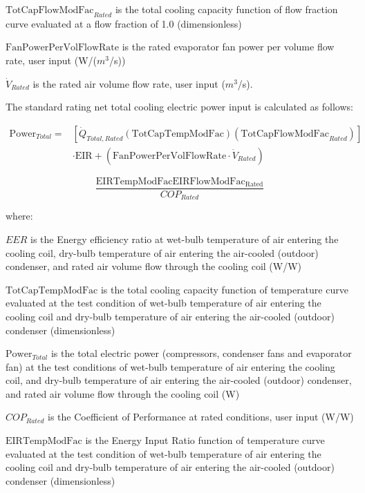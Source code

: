 \(\text{TotCapFlowModFac}_{Rated}\) is the total cooling capacity function of flow fraction curve evaluated at a flow fraction of 1.0 (dimensionless)

\(\text{FanPowerPerVolFlowRate}\) is the rated evaporator fan power per volume flow rate, user input (W/(\(m^3\)/s))

\(\dot{V}_{Rated}\) is the rated air volume flow rate, user input (\(m^3\)/s).

The standard rating net total cooling electric power input is calculated as follows:

\begin{equation}
\begin{array}{rl}
  \mathrm{Power}_{Total} =& \left[ \dot{Q}_{Total,Rated} \left( \mathrm{TotCapTempModFac} \right) \left( \mathrm{TotCapFlowModFac}_{Rated} \right) \right] \\
& \cdot \mathrm{EIR} + \left( \mathrm{FanPowerPerVolFlowRate} \cdot \dot{V}_{Rated} \right)
\end{array}
\end{equation}

\begin{equation}
  \frac{\mathrm{EIRTempModFac} \mathrm{EIRFlowModFac_{Rated}}}{COP_{Rated}}
\end{equation}

where:

\(EER\) is the Energy efficiency ratio at wet-bulb temperature of air entering the cooling coil, dry-bulb temperature of air entering the air-cooled (outdoor) condenser, and rated air volume flow through the cooling coil (W/W)

\(\mathrm{TotCapTempModFac}\) is the total cooling capacity function of temperature curve evaluated at the test condition of wet-bulb temperature of air entering the cooling coil and dry-bulb temperature of air entering the air-cooled (outdoor) condenser (dimensionless)

\(\mathrm{Power}_{Total}\) is the total electric power (compressors, condenser fans and evaporator fan) at the test conditions of wet-bulb temperature of air entering the cooling coil, and dry-bulb temperature of air entering the air-cooled (outdoor) condenser, and rated air volume flow through the cooling coil (W)

\(COP_{Rated}\) is the Coefficient of Performance at rated conditions, user input (W/W)

\(\mathrm{EIRTempModFac}\) is the Energy Input Ratio function of temperature curve evaluated at the test condition of wet-bulb temperature of air entering the cooling coil and dry-bulb temperature of air entering the air-cooled (outdoor) condenser (dimensionless)

